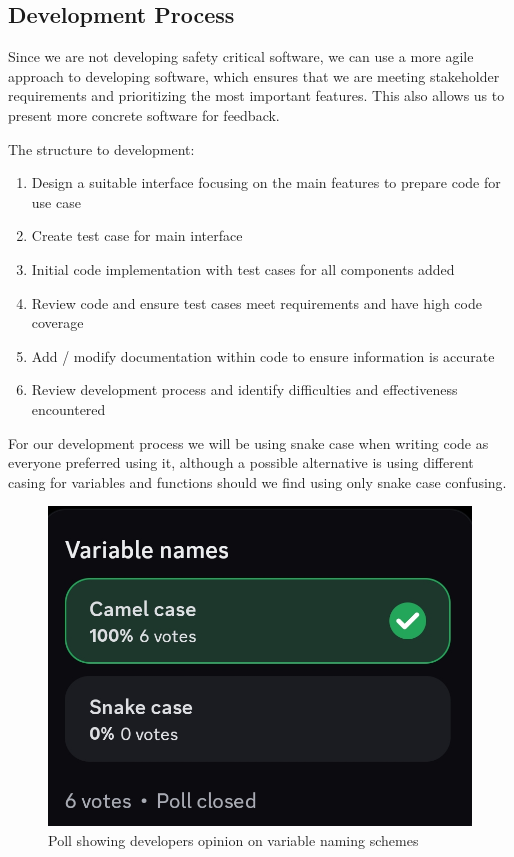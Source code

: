 \subsection{Development Process}
Since we are not developing safety critical software, we can use a more agile approach
to developing software, which ensures that we are meeting stakeholder requirements and prioritizing
the most important features. This also allows us to present more concrete software for feedback.

\par
The structure to development:\\
\begin{enumerate}
\item Design a suitable interface focusing on the main features to prepare code for use case
\item Create test case for main interface
\item Initial code implementation with test cases for all components added
\item Review code and ensure test cases meet requirements and have high code coverage
\item Add / modify documentation within code to ensure information is accurate
\item Review development process and identify difficulties and effectiveness encountered %
\end{enumerate}
\par
For our development process we will be using snake case when writing code as everyone
preferred using it, although a possible alternative is using different casing for
variables and functions should we find using only snake case confusing.
\begin{figure}[h!]
    \centering
    \includegraphics[width=0.5\linewidth]{variableNamingPoll}
    \caption{Poll showing developers opinion on variable naming schemes}
    \label{fig:variableNamingPoll}
\end{figure}
